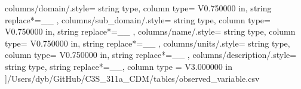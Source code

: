     columns/domain/.style={
            string type, 
            column type= V{0.750000 in}, 
            string replace*={_}{\_}
        },
    columns/sub_domain/.style={
            string type, 
            column type= V{0.750000 in}, 
            string replace*={_}{\_}
        },
    columns/name/.style={
            string type, 
            column type= V{0.750000 in}, 
            string replace*={_}{\_}
        },
    columns/units/.style={
            string type, 
            column type= V{0.750000 in}, 
            string replace*={_}{\_}
        },
    columns/description/.style={
            string type, 
            string replace*={_}{\_},
            column type = V{3.000000 in}
        }
    ]{/Users/dyb/GitHub/C3S_311a_CDM/tables/observed_variable.csv}
